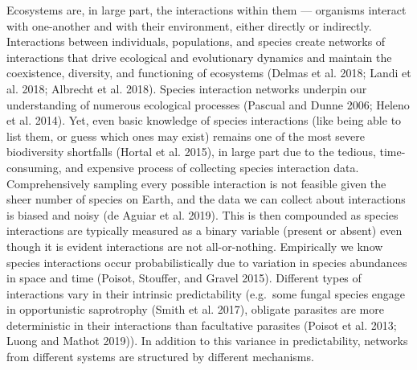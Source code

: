 \documentclass[10pt,oneside]{article}
\begin{document}
Ecosystems are, in large part, the interactions within them ---
organisms interact with one-another and with their environment, either
directly or indirectly. Interactions between individuals, populations,
and species create networks of interactions that drive ecological and
evolutionary dynamics and maintain the coexistence, diversity, and
functioning of ecosystems (Delmas et al. 2018; Landi et al. 2018;
Albrecht et al. 2018). Species interaction networks underpin our
understanding of numerous ecological processes (Pascual and Dunne 2006;
Heleno et al. 2014). Yet, even basic knowledge of species interactions
(like being able to list them, or guess which ones may exist) remains
one of the most severe biodiversity shortfalls (Hortal et al. 2015), in
large part due to the tedious, time-consuming, and expensive process of
collecting species interaction data. Comprehensively sampling every
possible interaction is not feasible given the sheer number of species
on Earth, and the data we can collect about interactions is biased and
noisy (de Aguiar et al. 2019). This is then compounded as species
interactions are typically measured as a binary variable (present or
absent) even though it is evident interactions are not all-or-nothing.
Empirically we know species interactions occur probabilistically due to
variation in species abundances in space and time (Poisot, Stouffer, and
Gravel 2015). Different types of interactions vary in their intrinsic
predictability (e.g.~some fungal species engage in opportunistic
saprotrophy (Smith et al. 2017), obligate parasites are more
deterministic in their interactions than facultative parasites (Poisot
et al. 2013; Luong and Mathot 2019)). In addition to this variance in
predictability, networks from different systems are structured by
different mechanisms.
\end{document}
